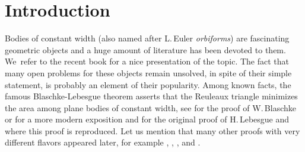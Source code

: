 \documentclass[11pt]{article}
\numberwithin{equation}{section}
\theoremstyle{plain}
\theoremstyle{definition}
\begin{document}
\section{Introduction}

Bodies of constant width (also named after L.\,Euler \emph{orbiforms}) are fascinating geometric
objects and a huge amount of literature has been devoted to them. We~refer to the recent book
\cite{MMO} for a nice presentation of the topic. The fact that many open problems for these objects
remain unsolved, in spite of their simple statement, is probably an element of their popularity.
Among known facts, the famous Blaschke-Lebesgue theorem asserts that the Reuleaux triangle
minimizes the area among plane bodies of constant width, see \cite{Bla} for the proof of W.\,Blaschke or \cite{KM} for a more modern exposition and \cite{Le} for the original proof of H.\,Lebesgue
and \cite{BF} where this proof is reproduced. Let us mention that many
other proofs with very different flavors appeared later, for example \cite{Be}, \cite{CCG},
\cite{Eg}, \cite{Ga} and \cite{Ha}.
\end{document}
